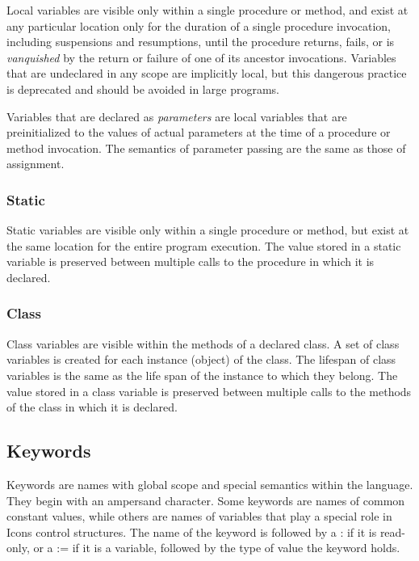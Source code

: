 Local variables are visible only within a single procedure or method,
and exist at any particular location only for the duration of a single
procedure invocation, including suspensions and resumptions, until the
procedure returns, fails, or is \textit{vanquished} by the return or
failure of one of its ancestor invocations. Variables that are
undeclared in any scope are implicitly local, but this
dangerous practice is deprecated and should be avoided in large
programs.

Variables that are declared as \textit{parameters} are local variables
that are preinitialized to the values of actual parameters at the time
of a procedure or method invocation. The semantics of parameter passing
are the same as those of assignment.

\subsubsection{Static}

Static variables are visible only within a single procedure or method,
but exist at the same location for the entire program execution. The
value stored in a static variable is preserved between multiple calls
to the procedure in which it is declared.

\subsubsection{Class}

Class variables are visible within the methods of a declared class. A
set of class variables is created for each
instance (object) of the class. The lifespan of
class variables is the same as the life span of the instance to which
they belong. The value stored in a class variable is preserved between
multiple calls to the methods of the class in which it is declared.

\subsection[Keywords]{Keywords}

Keywords are names with global scope and special semantics
within the language. They begin with an ampersand character. Some
keywords are names of common constant values, while others are names of
variables that play a special role in Icon{\textquotesingle}s
control structures. The name of the keyword is
followed by a : if it is read-only, or a := if it is a variable,
followed by the type of value the keyword holds.

